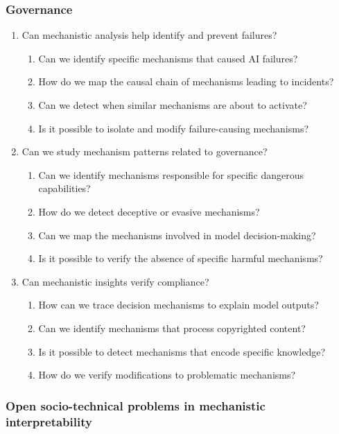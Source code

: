 \subsubsection{Governance}
\begin{enumerate}
    \item Can mechanistic analysis help identify and prevent failures?
    \begin{enumerate}[label=\alph*.]
        \item Can we identify specific mechanisms that caused AI failures?
        \item How do we map the causal chain of mechanisms leading to incidents?
        \item Can we detect when similar mechanisms are about to activate?
        \item Is it possible to isolate and modify failure-causing mechanisms?
    \end{enumerate}
    
    \item Can we study mechanism patterns related to governance?
    \begin{enumerate}[label=\alph*.]
        \item Can we identify mechanisms responsible for specific dangerous capabilities?
        \item How do we detect deceptive or evasive mechanisms?
        \item Can we map the mechanisms involved in model decision-making?
        \item Is it possible to verify the absence of specific harmful mechanisms?
    \end{enumerate}
    
    \item Can mechanistic insights verify compliance?
    \begin{enumerate}[label=\alph*.]
        \item How can we trace decision mechanisms to explain model outputs?
        \item Can we identify mechanisms that process copyrighted content?
        \item Is it possible to detect mechanisms that encode specific knowledge?
        \item How do we verify modifications to problematic mechanisms?
    \end{enumerate}
\end{enumerate}

\subsubsection{Open socio-technical problems in mechanistic interpretability}



